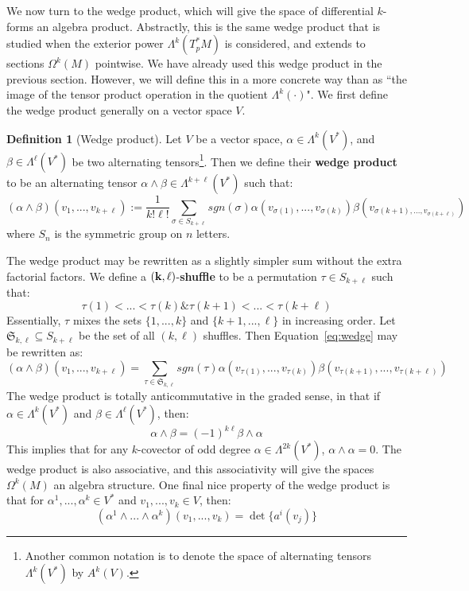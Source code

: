 \documentclass[11pt, oneside]{article}   	%
\theoremstyle{definition}
\newtheorem{definition}{Definition}[section]
\begin{document}
We now turn to the wedge product, which will give the space of differential $k$-forms an algebra product. Abstractly, this 
is the same wedge product that is studied when the exterior power $\Lambda^k(T_p^* M)$ is considered, and extends 
to sections $\Omega^k(M)$ pointwise. We have already used this wedge product in the previous section. However, we will 
define this in a more concrete way than as ``the image of the tensor product operation in the quotient $\Lambda^k(\cdot)$". 
We first define the wedge product generally on a vector space $V$. 

\begin{definition}[Wedge product]
	Let $V$ be a vector space, $\alpha\in\Lambda^k(V^*)$, and $\beta\in\Lambda^\ell(V^*)$ be two alternating 
	tensors\footnote{Another common notation is to denote the space of alternating tensors 
	$\Lambda^k(V^*)$ by $A^k(V)$.}. Then we define their \textbf{wedge product} to be an alternating tensor 
	$\alpha\wedge\beta\in\Lambda^{k + \ell}(V^*)$ such that:
	\begin{equation}
		(\alpha\wedge\beta)(v_1, ..., v_{k + \ell}) := \frac{1}{k!\ell!}\sum_{\sigma\in S_{k + \ell}}sgn(\sigma)
		\alpha(v_{\sigma(1)}, ..., v_{\sigma(k)})\beta(v_{\sigma(k + 1), ..., v_{\sigma(k + \ell)}})~
		\label{eq:wedge}
	\end{equation}
	where $S_n$ is the symmetric group on $n$ letters. 
\end{definition}

The wedge product may be rewritten as a slightly simpler sum without the extra factorial factors. We define a 
$\bf{(k, \ell)}$-\textbf{shuffle} to be a permutation $\tau\in S_{k + \ell}$ such that:
\begin{equation}
	\tau(1) < ... < \tau(k) \& \tau(k + 1) < ... < \tau(k + \ell)
\end{equation}
Essentially, $\tau$ mixes the sets $\{1, ..., k\}$ and $\{k + 1, ..., \ell\}$ in increasing order. Let $\mathfrak S_{k, \ell}\subseteq
S_{k + \ell}$ be the set of all $(k, \ell)$ shuffles. Then Equation~\ref{eq:wedge} may be rewritten as:
\begin{equation}
	(\alpha\wedge\beta)(v_1, ..., v_{k + \ell}) = \sum_{\tau\in\mathfrak S_{k, \ell}}sgn(\tau)\alpha(v_{\tau(1)}, ..., v_{\tau(k)})
	\beta(v_{\tau(k + 1)}, ..., v_{\tau(k + \ell)})
\end{equation}
The wedge product is totally anticommutative in the graded sense, in that if $\alpha\in\Lambda^k(V^*)$ and $\beta\in
\Lambda^\ell(V^*)$, then:
\begin{equation}
	\alpha\wedge\beta = (-1)^{k\ell}\beta\wedge\alpha
\end{equation}
This implies that for any $k$-covector of odd degree $\alpha\in\Lambda^{2k}(V^*)$, $\alpha\wedge\alpha = 0$. The wedge 
product is also associative, and this associativity will give the spaces $\Omega^k(M)$ an algebra structure. One final nice 
property of the wedge product is that for $\alpha^1, ..., \alpha^k\in V^*$ and $v_1, ..., v_k\in V$, then:
\begin{equation}
	(\alpha^1\wedge ...\wedge\alpha^k)(v_1, ..., v_k) = \det\{a^i(v_j)\}
\end{equation}
\end{document}
